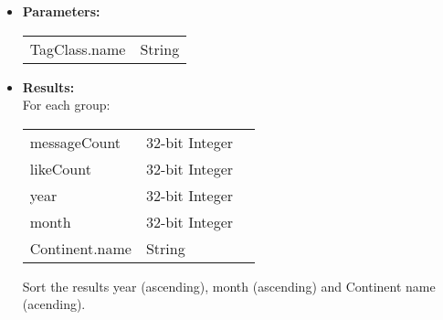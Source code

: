 {\begin{enumerate}
\begin{itemize}
                  \begin{itemize}
                    \item First, by year,
                    \item Second, by month of their publication
                    \item Third, by the continent.
                  \end{itemize}

                \item \textbf{Parameters:} \\
                    \begin{tabular}{ll}
                      TagClass.name & String \\
                    \end{tabular}
                \item \textbf{Results:} \\
                  For each group:

                    \begin{tabular}{lll}
                      messageCount & 32-bit Integer & \\
                      likeCount & 32-bit Integer & \\
                      year & 32-bit Integer & \\
                      month & 32-bit Integer & \\
                      Continent.name & String & \\
                    \end{tabular}

                    Sort the results year (ascending), month (ascending) and Continent name (acending).
                    \end{itemize}
\end{enumerate}
}
